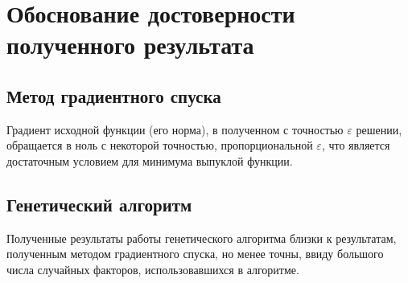 \documentclass[10pt,a4paper,titlepage]{article}
\begin{document}
\section{Обоснование достоверности полученного результата}
\subsection{Метод градиентного спуска}
Градиент исходной функции (его норма), в полученном с точностью $\varepsilon$ решении, обращается в ноль с некоторой точностью, 
пропорциональной $\varepsilon$, что является достаточным условием для минимума выпуклой функции.

\subsection{Генетический алгоритм}
Полученные результаты работы генетического алгоритма близки к результатам, полученным методом градиентного спуска, 
но менее точны, ввиду большого числа случайных факторов, использовавшихся в алгоритме.
\end{document}
